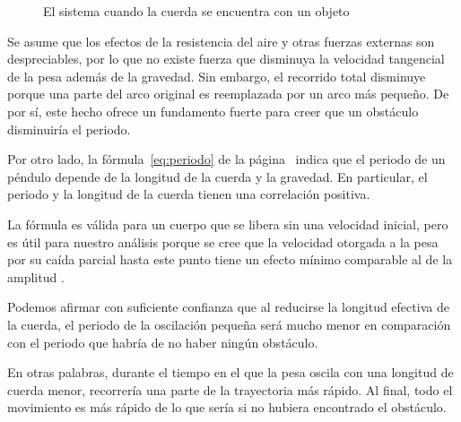 \documentclass[letterpaper]{report}
\numberwithin{table}{section}
\begin{document}
\begin{figure}[h]
  \centering
  \caption{El sistema cuando la cuerda se encuentra con un objeto}
\end{figure}

Se asume que los efectos de la resistencia del aire y otras fuerzas
externas son despreciables, por lo que no existe fuerza que disminuya
la velocidad tangencial de la pesa además de la gravedad. Sin
embargo, el recorrido total disminuye porque una parte del arco
original es reemplazada por un arco más pequeño. De por sí, este
hecho ofrece un fundamento fuerte para creer que un obstáculo
disminuiría el periodo.

Por otro lado, la fórmula~\eqref{eq:periodo} de la
página~\pageref{eq:periodo} indica que el periodo de un péndulo
depende de la longitud de la cuerda y la gravedad. En particular, el
periodo y la longitud de la cuerda tienen una correlación positiva.

La fórmula es válida para un cuerpo que se libera sin una velocidad
inicial, pero es útil para nuestro análisis porque se cree que la velocidad
otorgada a la pesa por su caída parcial hasta este punto tiene un
efecto mínimo comparable al de la amplitud \alpha.

Podemos afirmar con suficiente confianza que al reducirse la longitud
efectiva de la cuerda, el periodo de la oscilación pequeña será mucho
menor en comparación con el periodo que habría de no haber ningún obstáculo.

En otras palabras, durante el tiempo en el que la pesa oscila con
una longitud de cuerda menor, recorrería una parte de la trayectoria
más rápido. Al final, todo el movimiento es más rápido de lo que
sería si no hubiera encontrado el obstáculo.
\end{document}
